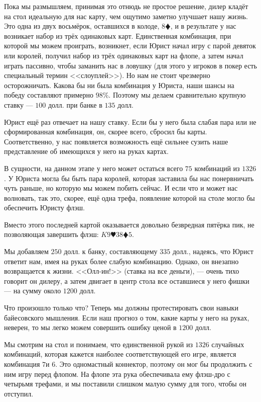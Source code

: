 Пока мы размышляем, принимая это отнюдь не простое решение, дилер кладёт на стол идеальную для нас карту, чем ощутимо заметно улучшает нашу жизнь. Это одна из двух восьмёрок, оставшихся в колоде, $8\vardiamond$, и в результате у нас возникает набор из трёх одинаковых карт. Единственная комбинация, при которой мы можем проиграть, возникнет, если Юрист начал игру с парой девяток или королей, получил набор из трёх одинаковых карт на флопе, а затем начал играть пассивно, чтобы заманить нас в ловушку (для этого у игроков в покер есть специальный термин <<слоуплей>>). Но нам не стоит чрезмерно осторожничать. Какова бы ни была комбинация у Юриста, наши шансы на победу составляют примерно $98\%$. Поэтому мы делаем сравнительно крупную ставку --- $100$ долл. при банке в $135$ долл.

Юрист ещё раз отвечает на нашу ставку. Если бы у него была слабая пара или не сформированная комбинация, он, скорее всего, сбросил бы карты. Соответственно, у нас появляется возможность ещё сильнее сузить наше представление об имеющихся у него на руках картах.

В сущности, на данном этапе у него может остаться всего $75$ комбинаций из $1326$. У Юриста могла бы быть пара королей, которая заставила бы нас понервничать чуть раньше, но которую мы можем побить сейчас. И если что и может нас волновать, так это, скорее, ещё одна трефа, появление которой на столе могло бы обеспечить Юристу флэш.

Вместо этого последней картой оказывается довольно безвредная пятёрка пик, не позволяющая завершить флэш:  $K$\clubsuit  $9\varheart  3$\clubsuit $8\vardiamond 5$\spadesuit.

Мы добавляем $250$ долл. к банку, составляющему $335$ долл., надеясь, что Юрист ответит нам, имея на руках более слабую комбинацию. Однако, он внезапно возвращается к жизни. <<Олл-ин!>> (ставка на все деньги), --- очень тихо говорит он дилеру, а затем двигает в центр стола все оставшиеся у него фишки --- на сумму около $1200$ долл.

Что произошло только что? Теперь мы должны протестировать свои навыки байесовского мышления. Если наш прогноз о том, какие карты у него на руках, неверен, то мы легко можем совершить ошибку ценой в $1200$ долл.

Мы смотрим на стол и понимаем, что единственной рукой из $1326$ случайных комбинаций, которая кажется наиболее соответствующей его игре, является комбинация $7$\clubsuit и $6$\clubsuit. Это одномастный коннектор, поэтому он мог бы продолжить с ним игру перед флопом. На флопе эта рука обеспечивала ему флэш-дро с четырьмя трефами, и мы поставили слишком малую сумму для того, чтобы он отступил.


